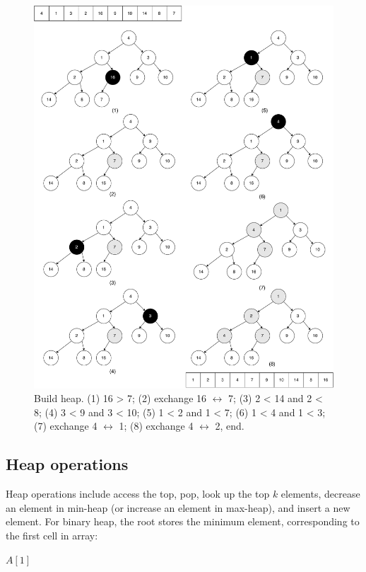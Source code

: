 \documentclass[b5paper]{article}
\begin{document}
\begin{figure}[htbp]
  \centering
  \includegraphics[scale=0.4]{img/build-heap}
  \caption{Build heap. (1) 16 > 7; (2) exchange 16 $\leftrightarrow$ 7; (3) 2 < 14 and 2 < 8; (4) 3 < 9 and 3 < 10; (5) 1 < 2 and 1 < 7; (6) 1 < 4 and 1 < 3; (7) exchange 4 $\leftrightarrow$ 1; (8) exchange 4 $\leftrightarrow$ 2, end.}
  \label{fig:build-heap-3}
\end{figure}

\subsection{Heap operations}

Heap operations include access the top, pop, look up the top $k$ elements, decrease an element in min-heap (or increase an element in max-heap), and insert a new element. For binary heap, the root stores the minimum element, corresponding to the first cell in array:

\begin{algorithmic}[1]
  \State \Return $A[1]$
\EndFunction
\end{algorithmic}
\end{document}
